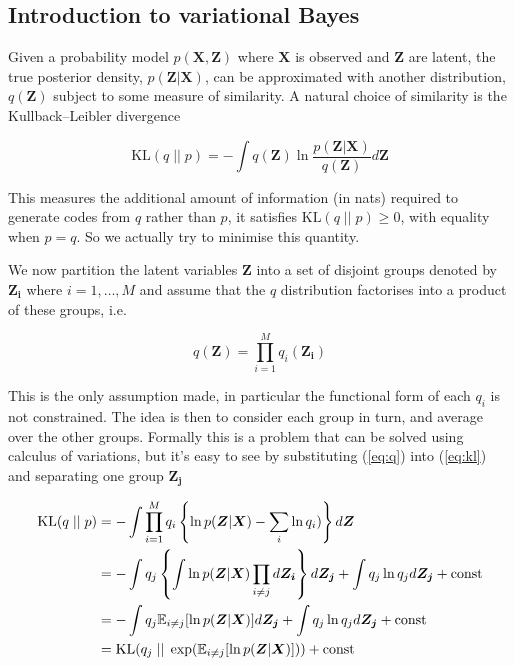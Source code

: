 \documentclass{article}
\begin{document}
\subsection{Introduction to variational Bayes}

Given a probability model $p(\boldsymbol{X}, \boldsymbol{Z})$ where $\boldsymbol{X}$ is observed and $\boldsymbol{Z}$ are latent, the true posterior density, $p(\boldsymbol{Z} | \boldsymbol{X})$, can be approximated with another distribution, $q(\boldsymbol{Z})$ subject to some measure of similarity. A natural choice of similarity is the Kullback–Leibler divergence

\begin{equation}
\label{eq:kl}
   \text{KL} (q\; ||\; p) = -\int q(\boldsymbol{Z}) \ln \frac{p(\boldsymbol{Z} | \boldsymbol{X})}{q(\boldsymbol{Z})} d\boldsymbol{Z}
\end{equation}

This measures the additional amount of information (in nats) required to generate codes from $q$ rather than $p$, it satisfies $\text{KL}(q\; ||\; p) \ge 0$, with equality when $p = q$. So we actually try to minimise this quantity.

We now partition the latent variables $\boldsymbol{Z}$ into a set of disjoint groups denoted by $\boldsymbol{Z_i}$ where $i = 1, \dots, M$ and assume that the $q$ distribution factorises into a product of these groups, i.e.

\begin{equation}
\label{eq:q}
  q(\boldsymbol{Z}) = \prod_{i = 1}^M q_i(\boldsymbol{Z_i})
\end{equation}

This is the only assumption made, in particular the functional form of each $q_i$ is not constrained. The idea is then to consider each group in turn, and average over the other groups. Formally this is a problem that can be solved using calculus of variations, but it's easy to see by substituting (\ref{eq:q}) into (\ref{eq:kl}) and separating one group $\boldsymbol{Z_j}$

\begin{align}
    \text{KL}(q\; ||\; p) &= -\int \prod_{i = 1}^M q_i \left\{ \ln p(\boldsymbol{Z} | \boldsymbol{X}) - \sum_i \ln q_i) \right\} d \boldsymbol{Z}\notag \\
    &= -\int q_j \left\{ \int \ln p(\boldsymbol{Z} | \boldsymbol{X}) \prod_{i \ne j} d \boldsymbol{Z_i} \right\} d \boldsymbol{Z_j} + \int q_j \ln q_j d \boldsymbol{Z_j} + \text{const}\notag\\
    &= -\int q_j \mathbb{E}_{i \ne j}[\ln p(\boldsymbol{Z} | \boldsymbol{X})] d \boldsymbol{Z_j} + \int q_j \ln q_j d \boldsymbol{Z_j} + \text{const}\notag\\
    &= \text{KL}(q_j\; ||\; \exp (\mathbb{E}_{i \ne j}[\ln p(\boldsymbol{Z} | \boldsymbol{X})])) + \text{const}
\end{align}
\end{document}
